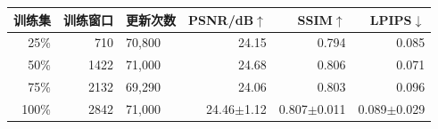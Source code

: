 \begin{tabular}{@{}rrlrrr@{}}
\toprule
训练集 & 训练窗口 & 更新次数 & PSNR/dB$\uparrow$ & SSIM$\uparrow$ & LPIPS$\downarrow$\\
\midrule
25\% & 710 & 70{,}800 & 24.15 & 0.794 & 0.085 \\
50\% & 1422 & 71{,}000 & 24.68 & 0.806 & 0.071 \\
75\% & 2132 & 69{,}290 & 24.06 & 0.803 & 0.096 \\
100\% & 2842 & 71{,}000 & 24.46$\pm$1.12 & 0.807$\pm$0.011 & 0.089$\pm$0.029 \\
\bottomrule
\end{tabular}
